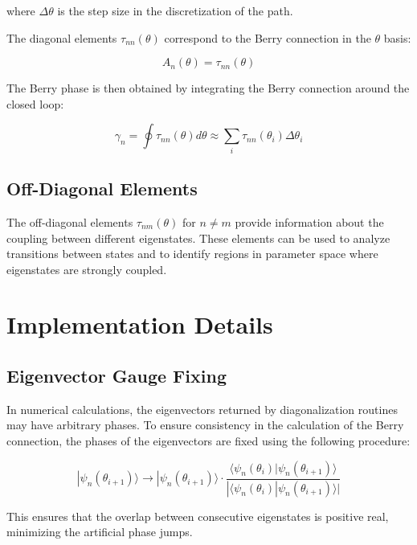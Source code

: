 \documentclass{article}
\begin{document}
where $\Delta\theta$ is the step size in the discretization of the path.

The diagonal elements $\tau_{nn}(\theta)$ correspond to the Berry connection in the $\theta$ basis:

\begin{equation}
A_n(\theta) = \tau_{nn}(\theta)
\end{equation}

The Berry phase is then obtained by integrating the Berry connection around the closed loop:

\begin{equation}
\gamma_n = \oint \tau_{nn}(\theta) d\theta \approx \sum_i \tau_{nn}(\theta_i) \Delta\theta_i
\end{equation}

\subsection{Off-Diagonal Elements}

The off-diagonal elements $\tau_{nm}(\theta)$ for $n \neq m$ provide information about the coupling between different eigenstates. These elements can be used to analyze transitions between states and to identify regions in parameter space where eigenstates are strongly coupled.

\section{Implementation Details}

\subsection{Eigenvector Gauge Fixing}

In numerical calculations, the eigenvectors returned by diagonalization routines may have arbitrary phases. To ensure consistency in the calculation of the Berry connection, the phases of the eigenvectors are fixed using the following procedure:

\begin{equation}
|\psi_n(\theta_{i+1})\rangle \rightarrow |\psi_n(\theta_{i+1})\rangle \cdot \frac{\langle \psi_n(\theta_i) | \psi_n(\theta_{i+1}) \rangle}{|\langle \psi_n(\theta_i) | \psi_n(\theta_{i+1}) \rangle|}
\end{equation}

This ensures that the overlap between consecutive eigenstates is positive real, minimizing the artificial phase jumps.
\end{document}
